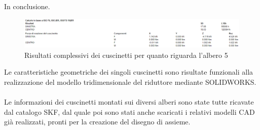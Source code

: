 In conclusione.
\begin{figure}[h]
    \centering
    \includegraphics[scale=0.55]{Immagini/RisultatiCuscinettiAlbero5.png}
    \caption{Risultati complessivi dei cuscinetti per quanto riguarda l'albero 5}
    \label{fig:RisultatiCuscinettiAlbero5}
\end{figure}

Le caratteristiche geometriche dei singoli cuscinetti sono risultate funzionali alla realizzazione del modello tridimensionale del riduttore mediante SOLIDWORKS.\\
\\
Le informazioni dei cuscinetti montati sui diversi alberi sono state tutte ricavate dal catalogo SKF, dal quale poi sono stati anche scaricati i relativi modelli CAD già realizzati, pronti per la creazione del disegno di assieme.

